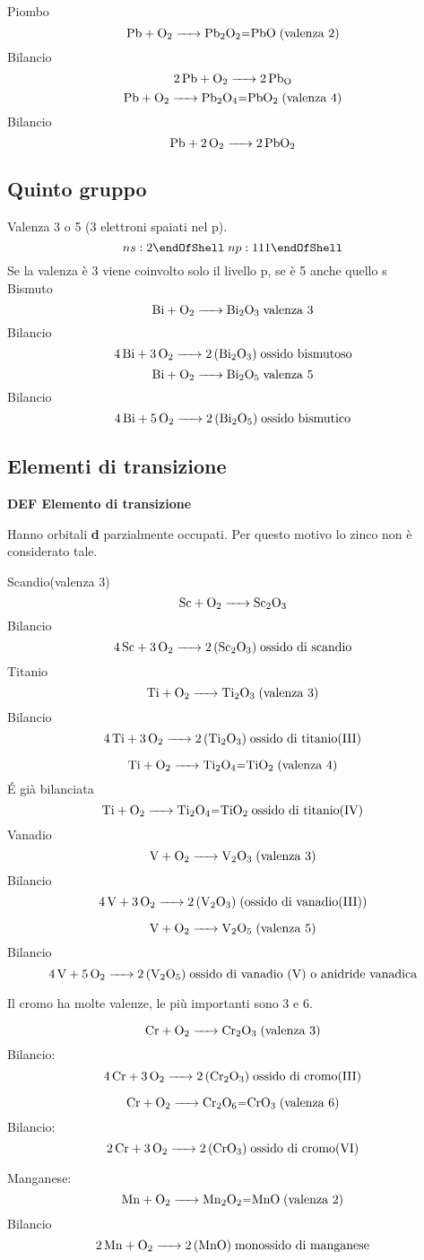 Piombo
$$\ce{Pb + O_2 -> Pb_2O_2=PbO} \; \text{(valenza 2)}$$
Bilancio
$$\ce{2Pb + O_2 -> 2Pb_O}$$
$$\ce{Pb + O_2 -> Pb_2O_4=PbO_2} \; \text{(valenza 4)}$$
Bilancio
$$\ce{Pb + 2O_2 -> 2PbO_2}$$
\subsection{Quinto gruppo}
Valenza 3 o 5 (3 elettroni spaiati nel p).
$$\subshell{ns:2} \; \subshell{np:111}$$
Se la valenza è 3 viene coinvolto solo il livello p, se è 5 anche quello s\\
Bismuto
$$\ce{ Bi + O_2 -> Bi_2O_3} \; \text{valenza 3}$$ Bilancio
$$\ce{ 4 Bi + 3 O_2 -> 2 (Bi_2O_3)} \; \text{ossido bismutoso}$$
$$\ce{ Bi + O_2 -> Bi_2O_5} \; \text{valenza 5}$$Bilancio
$$\ce{ 4 Bi + 5 O_2 -> 2 (Bi_2O_5)} \; \text{ossido bismutico}$$
\subsection{Elementi di transizione}
\textbf{DEF Elemento di transizione}

Hanno orbitali \textbf{d} parzialmente occupati. Per questo motivo lo zinco non è considerato tale.

Scandio(valenza 3)
$$\ce{ Sc + O_2 -> Sc_2O_3}$$ Bilancio
$$\ce{4 Sc + 3O_2 -> 2 (Sc_2O_3)} \; \text{ossido di scandio}$$
Titanio
$$\ce{ Ti + O_2 -> Ti_2O_3} \; \text{(valenza 3)}$$ Bilancio
$$\ce{4 Ti + 3 O_2 -> 2 (Ti_2O_3)} \; \text{ossido di titanio(III)}$$

$$\ce{ Ti + O_2 -> Ti_2O_4=TiO_2} \; \text{(valenza 4)}$$
É già bilanciata
$$\ce{ Ti + O_2 -> Ti_2O_4=TiO_2} \; \text{ossido di titanio(IV)}$$
Vanadio
$$\ce{ V + O_2 -> V_2O_3} \; \text{(valenza 3)}$$ Bilancio
$$\ce{ 4 V + 3 O_2 -> 2 (V_2O_3)} \; \text{(ossido di vanadio(III))}$$

$$\ce{V + O_2 -> V_2O_5} \; \text{(valenza 5)}$$Bilancio
$$\ce{ 4 V + 5 O_2 -> 2 (V_2O_5)} \;  \text{ossido di vanadio (V) o anidride vanadica}$$

Il cromo ha molte valenze, le più importanti sono 3 e 6.

$$\ce{ Cr + O_2 -> Cr_2O_3} \; \text{(valenza 3)}$$ Bilancio:
$$ \ce{ 4 Cr + 3 O_2 -> 2 (Cr_2O_3)}\; \text{ossido di cromo(III)}$$

$$\ce{ Cr + O_2 -> Cr_2O_6=CrO_3} \; \text{(valenza 6)}$$ Bilancio:
$$\ce{ 2 Cr + 3 O_2 -> 2 (CrO_3)}\; \text{ossido di cromo(VI)}$$

Manganese:
\\
$$\ce{ Mn + O_2 -> Mn_2O_2=MnO} \; \text{(valenza 2)}$$ Bilancio
$$\ce{ 2 Mn + O_2 -> 2 (MnO)} \; \text{monossido di manganese}$$

